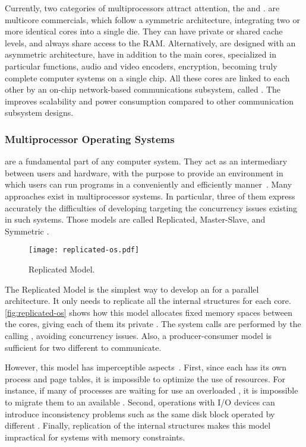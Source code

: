 			Currently, two categories of multiprocessors attract attention, the \cmp and \mpsoc.
			\cmps are multicore commercials, which follow a symmetric architecture,
			integrating two or more identical cores into a single die.
			They can have private or shared cache levels, and always share access
			to the RAM.
			Alternatively, \mpsocs are designed with an asymmetric architecture,
			have in addition to the main cores, specialized \cpus in particular
			functions, \eg audio and video encoders, encryption, becoming truly
			complete computer systems on a single chip.
			All these cores are linked to each other by an on-chip network-based
			communications subsystem, called \noc.
			The \noc improves scalability and power consumption compared to other
			communication subsystem designs.

		\subsubsection{Multiprocessor Operating Systems}
		\label{sec.multiprocessor-os}

			\oss are a fundamental part of any computer system.
			They act as an intermediary between users and hardware, with the
			purpose to provide an environment in which users can run programs
			in a conveniently and efficiently manner~\cite{Silberschatz:9ed}.
			Many \os approaches exist in multiprocessor systems.
			In particular, three of them express accurately the difficulties
			of developing \oss targeting the concurrency issues existing in
			such systems.
			Those models are called Replicated, Master-Slave, and Symmetric \os.

			\begin{figure}[!tb]
				\centering%
				\caption{Replicated \os Model.}%
				\label{fig:replicated-os}%
				\texttt{[image: replicated-os.pdf]}%
			\end{figure}

			The Replicated Model is the simplest way to develop an \os for a
			parallel architecture.
			It only needs to replicate all the internal \os structures for each core.
			\autoref{fig:replicated-os} shows how this model allocates fixed memory spaces
			between the cores, giving each of them its private \os.
			The system calls are performed by the calling \cpu, avoiding concurrency issues.
			Also, a producer-consumer model is sufficient for two different \cpus to communicate.

			However, this model has imperceptible aspects~\cite{tanenbaum:4ed}.
			First, since each \cpu has its own process and page tables, it is impossible
			to optimize the use of resources.
			For instance, if many of processes are waiting for use an overloaded \cpu,
			it is impossible to migrate them to an available \cpu.
			Second, operations with I/O devices can introduce inconsistency problems
			such as the same disk block operated by different \cpus.
			Finally, replication of the internal \os structures makes this model
			impractical for systems with memory constraints.

